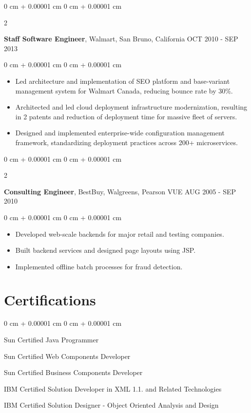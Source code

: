 \documentclass[10pt, letterpaper]{article}
\newenvironment{highlights}{
    \begin{itemize}[
        topsep=0.10 cm,
        parsep=0.10 cm,
        partopsep=0pt,
        itemsep=0pt,
        leftmargin=0 cm + 10pt
    ]
}{
    \end{itemize}
} %
\newenvironment{onecolentry}{
    \begin{adjustwidth}{
        0 cm + 0.00001 cm
    }{
        0 cm + 0.00001 cm
    }
}{
    \end{adjustwidth}
} %
\newenvironment{twocolentry}[2][]{
    \onecolentry
    \def\secondColumn{#2}
    \setcolumnwidth{\fill, 4.5 cm}
    \begin{paracol}{2}
}{
    \switchcolumn \raggedleft \secondColumn
    \end{paracol}
    \endonecolentry
} %
\begin{document}
        \vspace{0.20 cm}
        \begin{twocolentry}{
            OCT 2010 - SEP 2013
        }
            \textbf{Staff Software Engineer}, Walmart, San Bruno, California\end{twocolentry}
        \vspace{0.10 cm}
        \begin{onecolentry}
            \begin{highlights}
                \item Led architecture and implementation of SEO platform and base-variant management system for Walmart Canada, reducing bounce rate by 30\%.
                \item Architected and led cloud deployment infrastructure modernization, resulting in 2 patents and reduction of deployment time for massive fleet of servers.
                \item Designed and implemented enterprise-wide configuration management framework, standardizing deployment practices across 200+ microservices.
            \end{highlights}
        \end{onecolentry}

        \vspace{0.20 cm}
        \begin{twocolentry}{
            AUG 2005 - SEP 2010
        }
            \textbf{Consulting Engineer}, BestBuy, Walgreens, Pearson VUE\end{twocolentry}
        \vspace{0.10 cm}
        \begin{onecolentry}
            \begin{highlights}
                \item Developed web-scale backends for major retail and testing companies.
                \item Built backend services and designed page layouts using JSP.
                \item Implemented offline batch processes for fraud detection.
            \end{highlights}
        \end{onecolentry}

        \section{Certifications}
        \vspace{0.10 cm}
        \begin{onecolentry}
            \item Sun Certified Java Programmer
            \item Sun Certified Web Components Developer
            \item Sun Certified Business Components Developer
            \item IBM Certified Solution Developer in XML 1.1. and Related Technologies
            \item IBM Certified Solution Designer - Object Oriented Analysis and Design
        \end{onecolentry}
\end{document}
